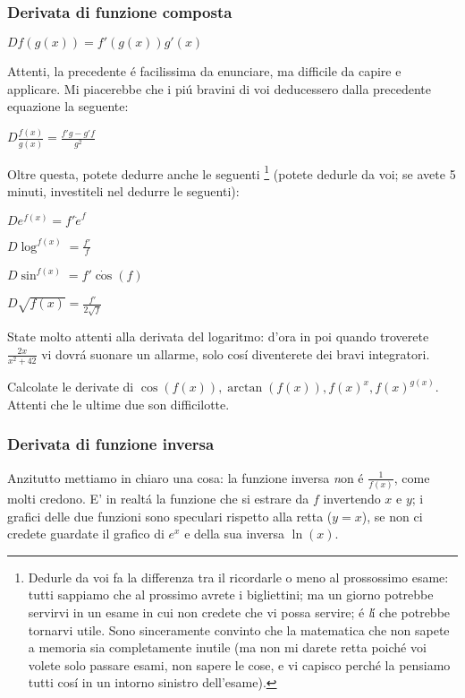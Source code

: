 \subsubsection{Derivata di funzione composta}
$D f(g(x)) = f'(g(x))g'(x)$

Attenti, la precedente \'e facilissima da enunciare, ma difficile da capire e applicare. Mi piacerebbe che i pi\'u bravini di voi deducessero dalla precedente equazione la seguente: 

$D \frac{f(x)}{g(x)} = \frac{f'g-g'f}{g^2}$

Oltre questa, potete dedurre anche le seguenti \footnote{Dedurle da voi fa la differenza tra il ricordarle o meno al prossossimo esame:
tutti sappiamo che al prossimo avrete i bigliettini; ma un giorno potrebbe servirvi in un esame in cui non credete che vi possa servire;
\'e {\emph l\'i} che potrebbe tornarvi utile. Sono sinceramente convinto che la matematica che non sapete a memoria sia completamente inutile
(ma non mi darete retta poich\'e voi volete solo passare esami, non sapere le cose, e vi capisco perch\'e la pensiamo tutti cos\'i in un
intorno sinistro dell'esame).} (potete dedurle da voi; se avete 5 minuti, investiteli nel dedurre le seguenti):

$D e^{f(x)} = f' \dot e^f$

$D \log^{f(x)} = \frac{f'}{f} $

$D \sin^{f(x)} = f' \dot \cos(f)$

$D \sqrt{f(x)} = \frac{f'}{2\sqrt{f}}$

State molto attenti alla derivata del logaritmo: d'ora in poi quando troverete $\frac{2x}{x^2+42}$ vi
dovr\'a suonare un allarme, solo cos\'i diventerete dei bravi integratori.

\begin{esercizio}
Calcolate le derivate di $\cos(f(x)),\arctan(f(x)),f(x)^x,f(x)^{g(x)}$. Attenti che le ultime due son difficilotte.
\end{esercizio}

\subsubsection{Derivata di funzione inversa}

Anzitutto mettiamo in chiaro una cosa: la funzione inversa {\emph non} \'e $\frac{1}{f(x)}$, come molti credono.
E' in realt\'a la funzione che si estrare da $f$ invertendo $x$ e $y$; i grafici delle due funzioni sono speculari rispetto alla retta ($y=x$), se non ci credete guardate il grafico di $e^x$ e della sua inversa $\ln(x)$.


